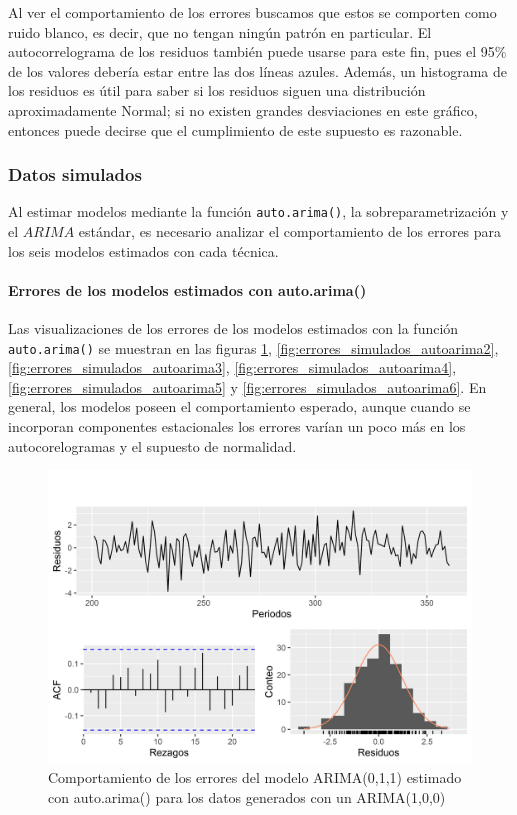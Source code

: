 \documentclass[
]{article}
\begin{document}
Al ver el comportamiento de los errores buscamos que estos se comporten
como ruido blanco, es decir, que no tengan ningún patrón en particular.
El autocorrelograma de los residuos también puede usarse para este fin,
pues el 95\% de los valores debería estar entre las dos líneas azules.
Además, un histograma de los residuos es útil para saber si los residuos
siguen una distribución aproximadamente Normal; si no existen grandes
desviaciones en este gráfico, entonces puede decirse que el cumplimiento
de este supuesto es razonable.

\subsubsection{Datos simulados}

Al estimar modelos mediante la función \texttt{auto.arima()}, la
sobreparametrización y el \(ARIMA\) estándar, es necesario analizar el
comportamiento de los errores para los seis modelos estimados con cada
técnica.

\paragraph{Errores de los modelos estimados con auto.arima()}

Las visualizaciones de los errores de los modelos estimados con la
función \texttt{auto.arima()} se muestran en las figuras
\ref{fig:errores_simulados_autoarima1},
\ref{fig:errores_simulados_autoarima2},
\ref{fig:errores_simulados_autoarima3},
\ref{fig:errores_simulados_autoarima4},
\ref{fig:errores_simulados_autoarima5} y
\ref{fig:errores_simulados_autoarima6}. En general, los modelos poseen
el comportamiento esperado, aunque cuando se incorporan componentes
estacionales los errores varían un poco más en los autocorelogramas y el
supuesto de normalidad.

\begin{figure}[H]
\includegraphics[width=1\linewidth,height=1\textheight]{Tesis_files/figure-latex/errores_simulados_autoarima1-1} \caption{Comportamiento de los errores del modelo ARIMA(0,1,1) estimado con auto.arima() para los datos generados con un ARIMA(1,0,0)}\label{fig:errores_simulados_autoarima1}
\end{figure}
\end{document}
